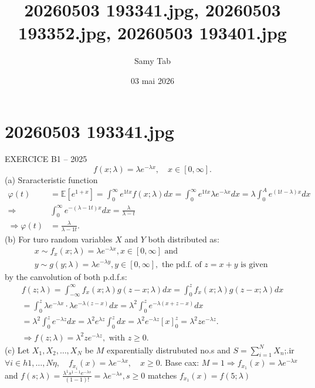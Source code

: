 \documentclass[12pt,a4paper]{article}
\title{20260503 193341.jpg, 20260503 193352.jpg, 20260503 193401.jpg}
\author{Samy Tab}
\date{03 mai 2026}
\begin{document}
\maketitle

\section*{20260503 193341.jpg}
EXERCICE B1 -- 2025
$$f(x ; \lambda)=\lambda e^{-\lambda x}, \quad x \in[0, \infty] .$$
(a) Sraracteristic function
$$\begin{aligned}
\varphi(t) & =\mathbb{E}\left[e^{1+x}\right]=\int_{0}^{\infty} e^{1 t x} f(x ; \lambda) d x=\int_{0}^{\infty} e^{1 t x} \lambda e^{-\lambda x} d x=\lambda \int_{0}^{A} e^{(1 t-\lambda) x} d x \\
\Rightarrow & \int_{0}^{\infty} e^{-(\lambda-1 t) x} d x=\frac{\lambda}{\lambda-t} \\
\Rightarrow \varphi(t) & =\frac{\lambda}{\lambda-1 t} .
\end{aligned}$$
(b) For turo random variables $X$ and $Y$ both distributed as:
$$\begin{array}{l}
x \sim f_{x}(x ; \lambda)=\lambda e^{-\lambda x}, x \in[0, \infty] \text { and } \\
y \sim g(y ; \lambda)=\lambda e^{-\lambda y}, y \in[0, \infty], \text { the pd.f. of } z=x+y \text { is given }
\end{array}$$
by the canvolution of both p.d.f.s:
$$\begin{array}{l} 
f(z ; \lambda)=\int_{-\infty}^{\infty} f_{x}(x ; \lambda) g(z-x ; \lambda) d x=\int_{0}^{z} f_{x}(x ; \lambda) g(z-x ; \lambda) d x \\
=\int_{0}^{z} \lambda e^{-\lambda x} \cdot \lambda e^{-\lambda(z-x)} d x=\lambda^{2} \int_{0}^{z} e^{-\lambda(x+z-x)} d x \\
=\lambda^{2} \int_{0}^{z} e^{-\lambda z} d x=\lambda^{2} e^{\lambda z} \int_{0}^{z} d x=\lambda^{2} e^{-\lambda z}[x]_{0}^{z}=\lambda^{2} z e^{-\lambda z} . \\
\Rightarrow f(z ; \lambda)=\lambda^{2} z e^{-\lambda z}, \text { with } z \geqslant 0 .
\end{array}$$
(c) Let $X_{1}, X_{2}, \ldots, X_{N}$ be $M$ exparentially distrubuted no.s and $S=\sum_{i=1}^{N} X_{n}$;.ir $\forall i \in h 1, \ldots, N \eta, \quad f_{x_{i}}(x)=\lambda e^{-\lambda x}, \quad x \geqslant 0$.
Base cax: $M=1 \Rightarrow f_{x_{1}}(x)=\lambda e^{-\lambda x}$ and $f(s ; \lambda)=\frac{\lambda^{1} s^{1-1} e^{-\lambda s}}{(1-1)!}=\lambda e^{-\lambda s}, s \geq 0$ matches $f_{x_{1}}(x)=f(5 ; \lambda)$
\end{document}
